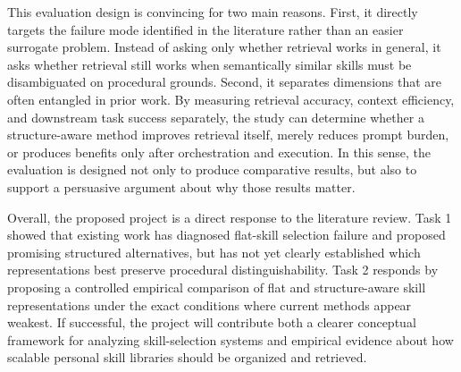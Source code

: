 \documentclass[a4paper]{article}
\begin{document}
This evaluation design is convincing for two main reasons. First, it directly targets the failure mode identified in the literature rather than an easier surrogate problem. Instead of asking only whether retrieval works in general, it asks whether retrieval still works when semantically similar skills must be disambiguated on procedural grounds. Second, it separates dimensions that are often entangled in prior work. By measuring retrieval accuracy, context efficiency, and downstream task success separately, the study can determine whether a structure-aware method improves retrieval itself, merely reduces prompt burden, or produces benefits only after orchestration and execution. In this sense, the evaluation is designed not only to produce comparative results, but also to support a persuasive argument about why those results matter.

Overall, the proposed project is a direct response to the literature review. Task 1 showed that existing work has diagnosed flat-skill selection failure and proposed promising structured alternatives, but has not yet clearly established which representations best preserve procedural distinguishability. Task 2 responds by proposing a controlled empirical comparison of flat and structure-aware skill representations under the exact conditions where current methods appear weakest. If successful, the project will contribute both a clearer conceptual framework for analyzing skill-selection systems and empirical evidence about how scalable personal skill libraries should be organized and retrieved.

\newpage


\end{document}
